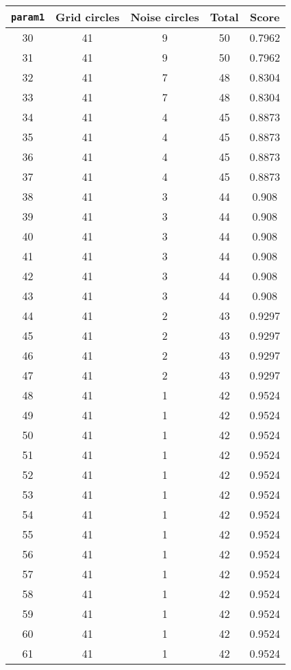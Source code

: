 \documentclass[letterpaper, 12pt]{article}
\begin{document}
\begin{longtable}{|c|c|c|c|c|}
\hline
\textbf{\texttt{param1}} & \textbf{Grid circles} & \textbf{Noise circles} & \textbf{Total} & \textbf{Score} \\
\hline
30 & 41 & 9 & 50 & 0.7962 \\
\hline
31 & 41 & 9 & 50 & 0.7962 \\
\hline
32 & 41 & 7 & 48 & 0.8304 \\
\hline
33 & 41 & 7 & 48 & 0.8304 \\
\hline
34 & 41 & 4 & 45 & 0.8873 \\
\hline
35 & 41 & 4 & 45 & 0.8873 \\
\hline
36 & 41 & 4 & 45 & 0.8873 \\
\hline
37 & 41 & 4 & 45 & 0.8873 \\
\hline
38 & 41 & 3 & 44 & 0.908 \\
\hline
39 & 41 & 3 & 44 & 0.908 \\
\hline
40 & 41 & 3 & 44 & 0.908 \\
\hline
41 & 41 & 3 & 44 & 0.908 \\
\hline
42 & 41 & 3 & 44 & 0.908 \\
\hline
43 & 41 & 3 & 44 & 0.908 \\
\hline
44 & 41 & 2 & 43 & 0.9297 \\
\hline
45 & 41 & 2 & 43 & 0.9297 \\
\hline
46 & 41 & 2 & 43 & 0.9297 \\
\hline
47 & 41 & 2 & 43 & 0.9297 \\
\hline
48 & 41 & 1 & 42 & 0.9524 \\
\hline
49 & 41 & 1 & 42 & 0.9524 \\
\hline
50 & 41 & 1 & 42 & 0.9524 \\
\hline
51 & 41 & 1 & 42 & 0.9524 \\
\hline
52 & 41 & 1 & 42 & 0.9524 \\
\hline
53 & 41 & 1 & 42 & 0.9524 \\
\hline
54 & 41 & 1 & 42 & 0.9524 \\
\hline
55 & 41 & 1 & 42 & 0.9524 \\
\hline
56 & 41 & 1 & 42 & 0.9524 \\
\hline
57 & 41 & 1 & 42 & 0.9524 \\
\hline
58 & 41 & 1 & 42 & 0.9524 \\
\hline
59 & 41 & 1 & 42 & 0.9524 \\
\hline
60 & 41 & 1 & 42 & 0.9524 \\
\hline
61 & 41 & 1 & 42 & 0.9524 \\

\end{longtable}
\end{document}

